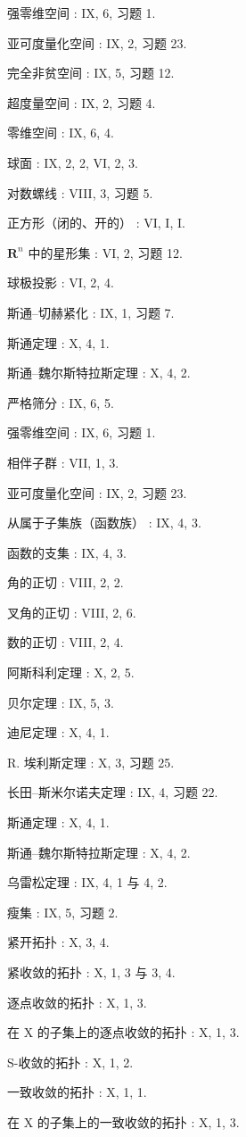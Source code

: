 强零维空间 : IX, 6, 习题 1.

亚可度量化空间 : IX, 2, 习题 23.

完全非贫空间 : IX, 5, 习题 12.

超度量空间 : IX, 2, 习题 4.

零维空间 : IX, 6, 4.

球面 : IX, 2, 2, VI, 2, 3.

对数螺线 : VIII, 3, 习题 5.

正方形（闭的、开的） : VI, I, I.

\(\mathbf{R}^n\) 中的星形集 : VI, 2, 习题 12.

球极投影 : VI, 2, 4.

斯通–切赫紧化 : IX, 1, 习题 7.

斯通定理 : X, 4, 1.

斯通–魏尔斯特拉斯定理 : X, 4, 2.

严格筛分 : IX, 6, 5.

强零维空间 : IX, 6, 习题 1.

相伴子群 : VII, 1, 3.

亚可度量化空间 : IX, 2, 习题 23.

从属于子集族（函数族） : IX, 4, 3.

函数的支集 : IX, 4, 3.

角的正切 : VIII, 2, 2.

叉角的正切 : VIII, 2, 6.

数的正切 : VIII, 2, 4.

阿斯科利定理 : X, 2, 5.

贝尔定理 : IX, 5, 3.

迪尼定理 : X, 4, 1.

R. 埃利斯定理 : X, 3, 习题 25.

长田–斯米尔诺夫定理 : IX, 4, 习题 22.

斯通定理 : X, 4, 1.

斯通–魏尔斯特拉斯定理 : X, 4, 2.

乌雷松定理 : IX, 4, 1 与 4, 2.

瘦集 : IX, 5, 习题 2.

紧开拓扑 : X, 3, 4.

紧收敛的拓扑 : X, 1, 3 与 3, 4.

逐点收敛的拓扑 : X, 1, 3.

在 X 的子集上的逐点收敛的拓扑 : X, 1, 3.

S-收敛的拓扑 : X, 1, 2.

一致收敛的拓扑 : X, 1, 1.

在 X 的子集上的一致收敛的拓扑 : X, 1, 3.

